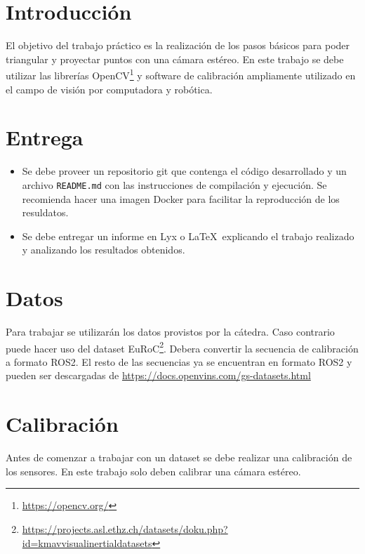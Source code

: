 \documentclass[tp]{lcc}
\begin{document}
\maketitle

\section{Introducción}

El objetivo del trabajo práctico es la realización de los pasos básicos para poder triangular y proyectar puntos con una cámara estéreo. En este trabajo se debe utilizar  las librerías OpenCV\footnote{\url{https://opencv.org/}} y software de calibración ampliamente utilizado en el campo de visión por computadora y robótica.


\section{Entrega}
\begin{itemize}
	\item Se debe proveer un repositorio git que contenga el código desarrollado y un archivo \lstinline{README.md} con las instrucciones de compilación y ejecución. Se recomienda hacer una imagen Docker para facilitar la reproducción de los resuldatos.
    
	\item Se debe entregar un informe en Lyx o \LaTeX\  explicando el trabajo realizado y analizando los resultados obtenidos.
\end{itemize}

\section{Datos}
Para trabajar se utilizarán los datos provistos por la cátedra. Caso contrario puede hacer uso del dataset EuRoC\footnote{\url{https://projects.asl.ethz.ch/datasets/doku.php?id=kmavvisualinertialdatasets}}. Debera convertir la secuencia de calibración a formato ROS2. El resto de las secuencias ya se encuentran en formato ROS2 y pueden ser descargadas de \url{https://docs.openvins.com/gs-datasets.html}

\section{Calibración}
Antes de comenzar a trabajar con un dataset se debe realizar una calibración de los sensores. En este trabajo solo deben calibrar una cámara estéreo.
\end{document}
